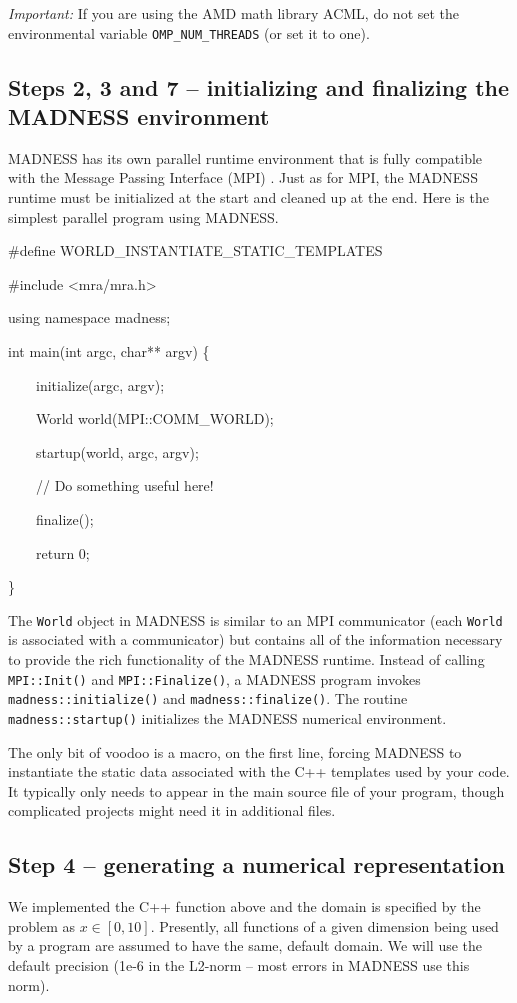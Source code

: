 \documentclass[letterpaper]{article}
\begin{document}
\textit{Important: }If you are using the AMD math library ACML, do not set the environmental variable
\texttt{OMP\_NUM\_THREADS} (or set it to one).

\subsection{Steps 2, 3 and 7 -- initializing and finalizing the MADNESS environment}
MADNESS has its own parallel runtime environment that is fully compatible with the Message Passing Interface (MPI) .
Just as for MPI, the MADNESS runtime must be initialized at the start and cleaned up at the end. Here is the simplest
parallel program using MADNESS.

{\ttfamily
\#define WORLD\_INSTANTIATE\_STATIC\_TEMPLATES}

{\ttfamily
\#include {\textless}mra/mra.h{\textgreater}}

{\ttfamily
using namespace madness;}

{\ttfamily
int main(int argc, char** argv) \{}

{\ttfamily
\ \ \ \ initialize(argc, argv);}

{\ttfamily
\ \ \ \ World world(MPI::COMM\_WORLD);}

{\ttfamily
\ \ \ \ startup(world, argc, argv);}

{\ttfamily
\ \ \ \ // Do something useful here!}

{\ttfamily
\ \ \ \ finalize();}

{\ttfamily
\ \ \ \ return 0;}

{\ttfamily
\}}


\bigskip

The \texttt{World} object in MADNESS is similar to an MPI communicator (each \texttt{World} is associated with a
communicator) but contains all of the information necessary to provide the rich functionality of the MADNESS runtime.
Instead of calling \texttt{MPI::Init()} and \texttt{MPI::Finalize()}, a MADNESS program invokes
\texttt{madness::initialize()} and \texttt{madness::finalize()}. The routine \texttt{madness::startup()} initializes
the MADNESS numerical environment.

The only bit of voodoo is a macro, on the first line, forcing MADNESS to instantiate the static data associated with the
C++ templates used by your code. It typically only needs to appear in the main source file of your program, though
complicated projects might need it in additional files. 

\subsection{Step 4 -- generating a numerical representation}
We implemented the C++ function above and the domain is specified by the problem as  $x\in [0,10]$. Presently, all
functions of a given dimension being used by a program are assumed to have the same, default domain. We will use the
default precision (1e-6 in the L2-norm -- most errors in MADNESS use this norm).
\end{document}
